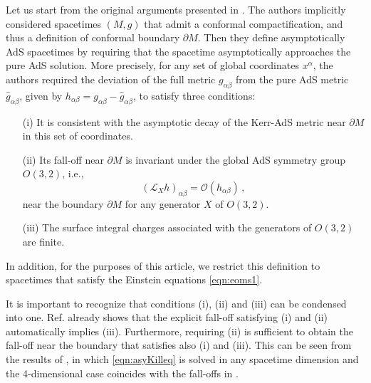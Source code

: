\documentclass[a4paper,11pt]{article}
\numberwithin{equation}{section}
\begin{document}
Let us start from the original arguments presented in \cite{Henneaux:1985tv}. 
The authors implicitly considered spacetimes $(M,g)$ that admit a conformal compactification, and thus a definition of conformal boundary $\partial M$.
Then they define asymptotically AdS spacetimes by requiring that the spacetime asymptotically approaches the pure AdS solution.
More precisely, for any set of global coordinates $x^\alpha$, the authors required the deviation of the full metric $g_{\alpha\beta}$ from the pure AdS metric $\hat{g}_{\alpha\beta}$, given by $h_{\alpha\beta}=g_{\alpha\beta}-\hat{g}_{\alpha\beta}$, to satisfy three conditions:
\begin{enumerate}
\item[(i)] It is consistent with the asymptotic decay of the Kerr-AdS metric near $\partial M$ in this set of coordinates.
\item[(ii)] Its fall-off near $\partial M$ is invariant under the global AdS symmetry group $O(3,2)$, i.e.,
\begin{equation}\label{eqn:asyKilleq}
(\mathcal{L}_X h)_{\alpha\beta}=\mathcal{O}(h_{\alpha\beta})\,,
\end{equation}
near the boundary $\partial M$ for any  generator  $X$ of $O(3,2)$.
\item[(iii)] The surface integral charges associated with the generators of $O(3,2)$ are finite.
\end{enumerate}
In addition, for the purposes of this article, we restrict this definition to spacetimes that satisfy the Einstein equations \eqref{eqn:eoms1}.

It is important to recognize that conditions (i), (ii) and (iii) can be condensed into one. Ref. \cite{Henneaux:1985tv} already shows that the explicit fall-off satisfying (i) and (ii) automatically implies (iii). 
Furthermore, requiring (ii) is sufficient to obtain the fall-off near the boundary that satisfies also (i) and (iii). 
This can be seen from the results of \cite{Henneaux:2006hk}, in which \eqref{eqn:asyKilleq} is solved in any spacetime dimension and the 4-dimensional case coincides with the fall-offs in \cite{Henneaux:1985tv}.
\end{document}
